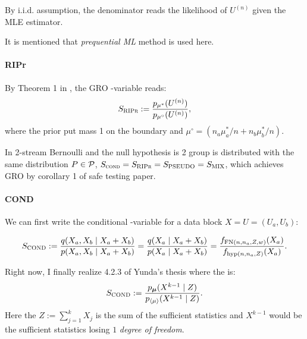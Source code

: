 By i.i.d. assumption, the denominator reads the likelihood of $U^{(n)}$ given the MLE estimator.

It is mentioned that \emph{prequential ML} method is used here.


\paragraph{RIPr}

By Theorem 1 in \cite{turnerExactAnytimevalidConfidence2023}, the GRO \E-variable
reads:
\begin{align*}
	S_{\textsc{RIPr}} := \frac{p_{\mu^*}(U^{(n)})}{p_{\mu^\circ}(U^{(n)})},
\end{align*}
where the prior put mass 1 on the boundary and $\mu^\circ = (n_a\mu^*_a/n + n_b \mu^*_b/n)$.

\begin{remark}
	In 2-stream Bernoulli and the null hypothesis is 2 group is distributed with the same distribution $P \in \mathcal{P}$,
	$S_{\textsc{cond}} = S_{\textsc{RIPr}} = S_{\textsc{PSEUDO}} = S_{\textsc{MIX}}$,
	which achieves GRO by corollary 1 of safe testing paper.
\end{remark}

\paragraph{COND}


We can first write the conditional \E-variable for a data block $X = U = (U_a, U_b)$:

\begin{align*}
	S_{\textsc{COND}} := \frac{q(X_a, X_b \mid X_a + X_b)}{p(X_a, X_b \mid X_a + X_b)}
	= \frac{q(X_a\mid X_a +X_b)}{p(X_a\mid X_a+X_b)}
	= \frac{f_{\textrm{FN}(n,n_a,Z,w)}(X_a)}{f_{\textrm{hyp}(n,n_a,Z)}(X_a)}.
\end{align*}

\begin{remark}
	Right now, I finally realize 4.2.3 of Yunda's thesis where the \E is:
	\begin{align*}
		S_{\textsc{COND}} := \frac{p_{\bm{\mu}}(X^{k-1}\mid Z)}{p_{\spri{\mu}}(X^{k-1}\mid Z)}.
	\end{align*}
	Here the $Z:=\sum_{j=1}^k X_j$ is the sum of the sufficient statistics and
	$X^{k-1}$ would be the sufficient statistics losing $1$ \emph{degree of freedom}.
\end{remark}


